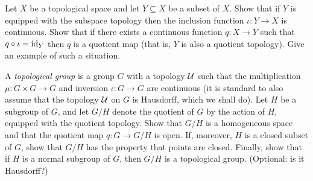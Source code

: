 \begin{exercise}
  Let \(X\) be a topological space and let \(Y\subseteq X\) be a subset of
  \(X\). Show that if \(Y\) is equipped with the subspace topology then the
  inclusion function \(\iota\colon Y\to X\) is continuous. Show that if
  there exists a continuous function \(q\colon X\to Y\) such that
  \(q\circ\iota=\operatorname{id}_Y\) then \(q\) is a quotient map (that is, \(Y\) is also
  a quotient topology). Give an example of such a situation.
\end{exercise}
\begin{solution}
\end{solution}

\begin{exercise}
  A \emph{topological group} is a group \(G\) with a topology \(\mathcal{U}\)
  such that the multiplication \(\mu\colon G\times G\to G\) and inversion
  \(\iota\colon G\to G\) are continuous (it is standard to also assume that
  the topology \(\mathcal{U}\) on \(G\) is Hausdorff, which we shall do). Let
  \(H\) be a subgroup of \(G\), and let \(G/H\) denote the quotient of
  \(G\) by the action of \(H\), equipped with the quotient topology. Show
  that \(G/H\) is a homogeneous space and that the quotient map \(q\colon
  G\to G/H\) is open. If, moreover, \(H\) is a closed subset of \(G\), show
  that \(G/H\) has the property that points are closed. Finally, show that
  if \(H\) is a normal subgroup of \(G\), then \(G/H\) is a topological
  group. (Optional: is it Hausdorff?)
\end{exercise}
\begin{solution}
\end{solution}

